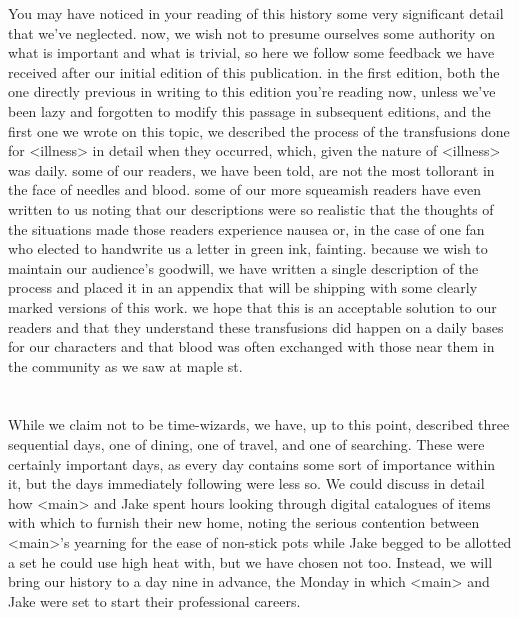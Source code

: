 \documentclass[12pt,openany]{memoir}
\begin{document}
You may have noticed in your reading of this history some very significant detail that we've neglected.
now, we wish not to presume ourselves some authority on what is important and what is trivial, so here we follow some feedback we have received after our initial edition of this publication.
in the first edition, both the one directly previous in writing to this edition you're reading now, unless we've been lazy and forgotten to modify this passage in subsequent editions, and the first one we wrote on this topic, we described the process of the transfusions done for <illness> in detail when they occurred, which, given the nature of <illness> was daily.
some of our readers, we have been told, are not the most tollorant in the face of needles and blood.  some of our more squeamish readers have even written to us noting that our descriptions were so realistic that the thoughts of the situations made those readers experience nausea or, in the case of one fan who elected to handwrite us a letter in green ink, fainting.
because we wish to maintain our audience's goodwill, we have written a single description of the process and placed it in an appendix that will be shipping with some clearly marked versions of this work.
we hope that this is an acceptable solution to our readers and that they understand these transfusions did happen on a daily bases for our characters and that blood was often exchanged with those near them in the community as we saw at maple st.

\chapter{}

While we claim not to be time-wizards, we have, up to this point, described three sequential days, one of dining, one of travel, and one of searching.
These were certainly important days, as every day contains some sort of importance within it, but the days immediately following were less so.
We could discuss in detail how <main> and Jake spent hours looking through digital catalogues of items with which to furnish their new home, noting the serious contention between <main>'s yearning for the ease of non-stick pots while Jake begged to be allotted a set he could use high heat with, but we have chosen not too.
Instead, we will bring our history to a day nine in advance, the Monday in which <main> and Jake were set to start their professional careers.
\\
\end{document}
